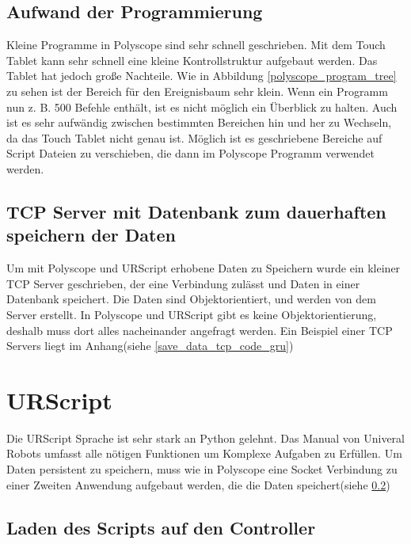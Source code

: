 \subsection{Aufwand der Programmierung}
\label{polyscope_aufwand}

Kleine Programme in Polyscope sind sehr schnell geschrieben. Mit dem Touch Tablet kann sehr schnell eine kleine Kontrollstruktur aufgebaut werden. Das Tablet hat jedoch große Nachteile. Wie in Abbildung \ref{polyscope_program_tree} zu sehen ist der Bereich für den Ereignisbaum sehr klein. Wenn ein Programm nun z. B. 500 Befehle enthält, ist es nicht möglich ein Überblick zu halten. Auch ist es sehr aufwändig zwischen bestimmten Bereichen hin und her zu Wechseln, da das Touch Tablet nicht genau ist. Möglich ist es geschriebene Bereiche auf Script Dateien zu verschieben, die dann im Polyscope Programm verwendet werden. 

\subsection{TCP Server mit Datenbank zum dauerhaften speichern der Daten}
\label{tcp_datentank_sicherung_rel}

Um mit Polyscope und URScript erhobene Daten zu Speichern wurde ein kleiner TCP Server geschrieben, der eine Verbindung zulässt und Daten in einer Datenbank speichert. Die Daten sind Objektorientiert, und werden von dem Server erstellt.
In Polyscope und URScript gibt es keine Objektorientierung, deshalb muss dort alles nacheinander angefragt werden.
Ein Beispiel einer TCP Servers liegt im Anhang(siehe \ref{save_data_tcp_code_gru})

\section{URScript}
\label{sec:ur_script_rel}

Die URScript Sprache ist sehr stark an Python gelehnt.
Das Manual von Univeral Robots umfasst alle nötigen Funktionen um Komplexe Aufgaben zu Erfüllen.
Um Daten persistent zu speichern, muss wie in Polyscope eine \ac{Socket} Verbindung zu einer Zweiten Anwendung aufgebaut werden, die die Daten speichert(siehe \ref{tcp_datentank_sicherung_rel})

\subsection{Laden des Scripts auf den Controller}
\label{load_script_rel}

